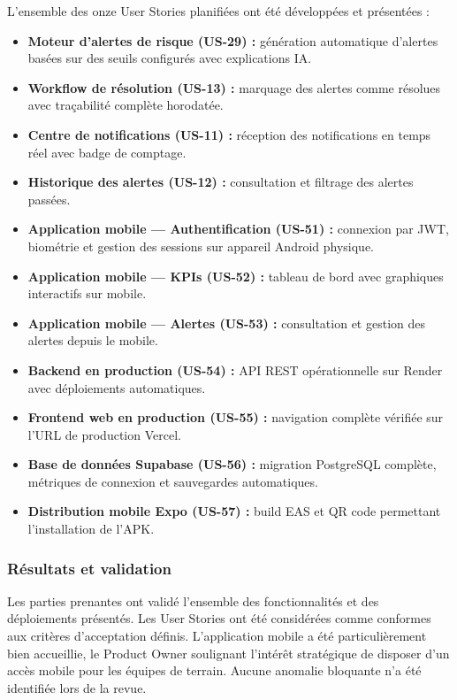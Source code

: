 \documentclass[a4paper,12pt]{report}
\begin{document}
L'ensemble des onze User Stories planifiées ont été développées et présentées :

\begin{itemize}
    \item \textbf{Moteur d'alertes de risque (US-29) :} génération automatique d'alertes basées sur des seuils configurés avec explications IA.
    \item \textbf{Workflow de résolution (US-13) :} marquage des alertes comme résolues avec traçabilité complète horodatée.
    \item \textbf{Centre de notifications (US-11) :} réception des notifications en temps réel avec badge de comptage.
    \item \textbf{Historique des alertes (US-12) :} consultation et filtrage des alertes passées.
    \item \textbf{Application mobile --- Authentification (US-51) :} connexion par JWT, biométrie et gestion des sessions sur appareil Android physique.
    \item \textbf{Application mobile --- KPIs (US-52) :} tableau de bord avec graphiques interactifs sur mobile.
    \item \textbf{Application mobile --- Alertes (US-53) :} consultation et gestion des alertes depuis le mobile.
    \item \textbf{Backend en production (US-54) :} API REST opérationnelle sur Render avec déploiements automatiques.
    \item \textbf{Frontend web en production (US-55) :} navigation complète vérifiée sur l'URL de production Vercel.
    \item \textbf{Base de données Supabase (US-56) :} migration PostgreSQL complète, métriques de connexion et sauvegardes automatiques.
    \item \textbf{Distribution mobile Expo (US-57) :} build EAS et QR code permettant l'installation de l'APK.
\end{itemize}

\subsubsection*{Résultats et validation}

Les parties prenantes ont validé l'ensemble des fonctionnalités et des déploiements présentés. Les User Stories ont été considérées comme conformes aux critères d'acceptation définis. L'application mobile a été particulièrement bien accueillie, le Product Owner soulignant l'intérêt stratégique de disposer d'un accès mobile pour les équipes de terrain. Aucune anomalie bloquante n'a été identifiée lors de la revue.
\end{document}
